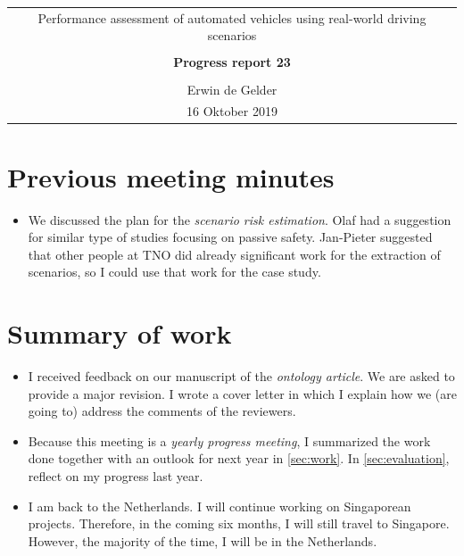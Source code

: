 \documentclass[10pt,final,a4paper,oneside,onecolumn]{article}
\newcommand{\progressreportnumber}{23}
\renewcommand{\author}{Erwin de Gelder}
\renewcommand{\date}{16 Oktober 2019}
\renewcommand{\title}{Performance assessment of automated vehicles using real-world driving scenarios}
\begin{document}
	
\begin{center}
	\begin{tabular}{c}
		\title \\ \\
		\textbf{\huge Progress report \progressreportnumber} \\ \\
		\author \\ 
		\date
	\end{tabular}
\end{center}



\section{Previous meeting minutes}

\begin{itemize}
	\item We discussed the plan for the \emph{scenario risk estimation}. Olaf had a suggestion for similar type of studies focusing on passive safety. Jan-Pieter suggested that other people at TNO did already significant work for the extraction of scenarios, so I could use that work for the case study.
\end{itemize}



\section{Summary of work}

\begin{itemize}
	\item I received feedback on our manuscript of the \emph{ontology article}. We are asked to provide a major revision. I wrote a cover letter in which I explain how we (are going to) address the comments of the reviewers.
	
	\item Because this meeting is a \emph{yearly progress meeting}, I summarized the work done together with an outlook for next year in \cref{sec:work}. In \cref{sec:evaluation}, reflect on my progress last year.
	
	\item I am back to the Netherlands. I will continue working on Singaporean projects. Therefore, in the coming six months, I will still travel to Singapore. However, the majority of the time, I will be in the Netherlands. 
\end{itemize}
\end{document}
